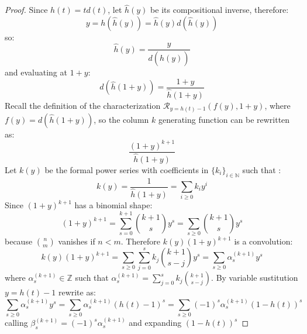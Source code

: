 \documentclass[11pt,a4paper]{article} %
\begin{document}
    \begin{proof}

    Since $h(t)=td(t)$, let $\hat{h}(y)$ be its compositional inverse, therefore:
    \begin{displaymath}
        y = h(\hat{h}(y)) = \hat{h}(y)d(\hat{h}(y)) 
    \end{displaymath}
    so:
    \begin{displaymath}
        \hat{h}(y) = \frac{y}{d(\hat{h}(y)) }
    \end{displaymath}
    and evaluating at $1+y$:
    \begin{displaymath}
        d(\hat{h}(1+y)) = \frac{1+y}{ \hat{h}(1+y)}
    \end{displaymath}
    Recall the definition of the characterization $\mathcal{R}_{y=h(t)-1}\left( f(y), 1+y \right)$,
    where $f(y)=d(\hat{h}(1+y))$, so the column $k$ generating function can be rewritten as:
    \begin{displaymath}
        \frac{(1+y)^{k+1}}{ \hat{h}(1+y)}
    \end{displaymath}
    Let $k(y)$ be the formal power series with coefficients in 
    $\lbrace k_i \rbrace_{i\in\mathbb{N}}$ such that :
    \begin{displaymath}
        k(y) = \frac{1}{ \hat{h}(1+y)} = \sum_{i\geq 0}{k_i}y^{i}
    \end{displaymath}
    Since $(1+y)^{k+1}$ has a binomial shape:
    \begin{displaymath}
        (1+y)^{k+1} = \sum_{s= 0}^{k+1}{{k+1}\choose{s}}y^{s}= \sum_{s\geq 0}{{k+1}\choose{s}}y^{s}
    \end{displaymath}
    because ${{n}\choose{m}}$ vanishes if $n<m$. Therefore $k(y)(1+y)^{k+1}$ is a convolution:
    \begin{displaymath}
        k(y)(1+y)^{k+1} = \sum_{s\geq 0}{\sum_{j=0}^{s}{k_j {{k+1}\choose{s-j}}} y^{s}} = 
            \sum_{s\geq 0}{\alpha_{s}^{(k+1)} y^{s}}
    \end{displaymath}
    where $\alpha_{s}^{(k+1)} \in \mathbb{Z}$ such that $\alpha_{s}^{(k+1)}=\sum_{j=0}^{s}{k_j {{k+1}\choose{s-j}}}$.
    By variable sustitution $y = h(t)-1$ rewrite as:
    \begin{displaymath}
        \sum_{s\geq 0}{\alpha_{s}^{(k+1)} y^{s}}
            = \sum_{s\geq 0}{\alpha_{s}^{(k+1)} (h(t)-1)^{s}}
            = \sum_{s\geq 0}{(-1)^{s}\alpha_{s}^{(k+1)} (1-h(t))^{s}}
    \end{displaymath}
    calling $\beta_{s}^{(k+1)}=(-1)^{s}\alpha_{s}^{(k+1)}$ and expanding $(1-h(t))^{s}$

\end{proof}
\end{document}
